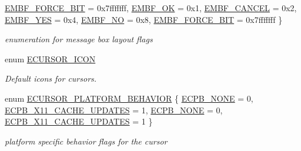 \begin{DoxyCompactItemize}
\hyperlink{namespaceirr_1_1gui_af55112e55731c9ad1b9fe9b372c521afaab935b4e63cc341d257a1a7d36a61f71}{E\+M\+B\+F\+\_\+\+F\+O\+R\+C\+E\+\_\+B\+IT} = 0x7fffffff, 
\hyperlink{namespaceirr_1_1gui_af55112e55731c9ad1b9fe9b372c521afa9660280349027f678b2315a15a23ba0e}{E\+M\+B\+F\+\_\+\+OK} = 0x1, 
\hyperlink{namespaceirr_1_1gui_af55112e55731c9ad1b9fe9b372c521afa4c6c6d37767c4caa272cb093b6e583ce}{E\+M\+B\+F\+\_\+\+C\+A\+N\+C\+EL} = 0x2, 
\hyperlink{namespaceirr_1_1gui_af55112e55731c9ad1b9fe9b372c521afad3740fa48d62f71940a3189c863aefb4}{E\+M\+B\+F\+\_\+\+Y\+ES} = 0x4, 
\newline
\hyperlink{namespaceirr_1_1gui_af55112e55731c9ad1b9fe9b372c521afa9c9d2e9cb44798f01cb4c25fd10d2f02}{E\+M\+B\+F\+\_\+\+NO} = 0x8, 
\hyperlink{namespaceirr_1_1gui_af55112e55731c9ad1b9fe9b372c521afaab935b4e63cc341d257a1a7d36a61f71}{E\+M\+B\+F\+\_\+\+F\+O\+R\+C\+E\+\_\+B\+IT} = 0x7fffffff
 \}\begin{DoxyCompactList}\small\item\em enumeration for message box layout flags \end{DoxyCompactList}
\item 
\mbox{\label{namespaceirr_1_1gui_aefee802dd632c5735703e40ef40f879b}} 
enum \hyperlink{namespaceirr_1_1gui_aefee802dd632c5735703e40ef40f879b}{E\+C\+U\+R\+S\+O\+R\+\_\+\+I\+C\+ON} \begin{DoxyCompactList}\small\item\em Default icons for cursors. \end{DoxyCompactList}
\item 
enum \hyperlink{namespaceirr_1_1gui_abbd186f9cfba2f805d98248df226acef}{E\+C\+U\+R\+S\+O\+R\+\_\+\+P\+L\+A\+T\+F\+O\+R\+M\+\_\+\+B\+E\+H\+A\+V\+I\+OR} \{ \hyperlink{namespaceirr_1_1gui_abbd186f9cfba2f805d98248df226acefab1e1e0914679b2f5abd09880a820659e}{E\+C\+P\+B\+\_\+\+N\+O\+NE} = 0, 
\hyperlink{namespaceirr_1_1gui_abbd186f9cfba2f805d98248df226acefa368fcb0e1b11b1acaae73d44b482ba4a}{E\+C\+P\+B\+\_\+\+X11\+\_\+\+C\+A\+C\+H\+E\+\_\+\+U\+P\+D\+A\+T\+ES} = 1, 
\hyperlink{namespaceirr_1_1gui_abbd186f9cfba2f805d98248df226acefab1e1e0914679b2f5abd09880a820659e}{E\+C\+P\+B\+\_\+\+N\+O\+NE} = 0, 
\hyperlink{namespaceirr_1_1gui_abbd186f9cfba2f805d98248df226acefa368fcb0e1b11b1acaae73d44b482ba4a}{E\+C\+P\+B\+\_\+\+X11\+\_\+\+C\+A\+C\+H\+E\+\_\+\+U\+P\+D\+A\+T\+ES} = 1
 \}\begin{DoxyCompactList}\small\item\em platform specific behavior flags for the cursor \end{DoxyCompactList}

\end{DoxyCompactItemize}
